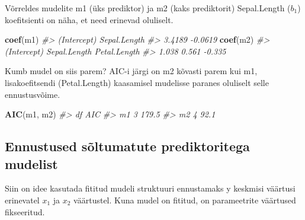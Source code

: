 \documentclass[]{book}
\newenvironment{Shaded}{\begin{snugshade}}{\end{snugshade}}
\newcommand{\KeywordTok}[1]{\textcolor[rgb]{0.13,0.29,0.53}{\textbf{#1}}}
\newcommand{\CommentTok}[1]{\textcolor[rgb]{0.56,0.35,0.01}{\textit{#1}}}
\newcommand{\NormalTok}[1]{#1}
\begin{document}
Võrreldes mudelite m1 (üks prediktor) ja m2 (kaks prediktorit)
Sepal.Length (\(b_1\)) koefitsienti on näha, et need erinevad oluliselt.

\begin{Shaded}
\begin{Highlighting}[]
\KeywordTok{coef}\NormalTok{(m1)}
\CommentTok{#>  (Intercept) Sepal.Length }
\CommentTok{#>       3.4189      -0.0619}
\KeywordTok{coef}\NormalTok{(m2)}
\CommentTok{#>  (Intercept) Sepal.Length Petal.Length }
\CommentTok{#>        1.038        0.561       -0.335}
\end{Highlighting}
\end{Shaded}

Kumb mudel on siis parem? AIC-i järgi on m2 kõvasti parem kui m1,
lisakoefitsendi (Petal.Length) kaasamisel mudelisse paranes oluliselt
selle ennustusvõime.

\begin{Shaded}
\begin{Highlighting}[]
\KeywordTok{AIC}\NormalTok{(m1, m2)}
\CommentTok{#>    df   AIC}
\CommentTok{#> m1  3 179.5}
\CommentTok{#> m2  4  92.1}
\end{Highlighting}
\end{Shaded}

\subsection*{Ennustused sõltumatute prediktoritega
mudelist}\label{ennustused-soltumatute-prediktoritega-mudelist}

Siin on idee kasutada fititud mudeli struktuuri ennustamaks y keskmisi
väärtusi erinevatel \(x_1\) ja \(x_2\) väärtustel. Kuna mudel on
fititud, on parameetrite väärtused fikseeritud.
\end{document}
